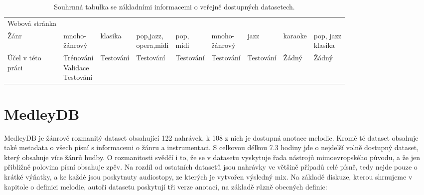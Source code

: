 \begin{table}[h!]
{\begin{tabular}{lllllllll}
        Webová stránka   & \tablefootnote{\url{https://medleydb.weebly.com/}} & \tablefootnote{\url{https://www.upf.edu/web/mtg/orchset}}      & \tablefootnote{\url{http://ismir2004.ismir.net/melody_contest/results.html}}       & \tablefootnote{\url{https://labrosa.ee.columbia.edu/projects/melody/}}       & \tablefootnote{\url{http://synthdatasets.weebly.com/mdb-melody-synth.html}}        & \tablefootnote{\url{https://jazzomat.hfm-weimar.de/}}    & \tablefootnote{\url{https://sites.google.com/site/unvoicedsoundseparation/mir-1k}} & \tablefootnote{\url{https://staff.aist.go.jp/m.goto/RWC-MDB/}} \\
        Žánr    & \shortstack[l]{mnoho-\\žánrový} & klasika & \shortstack[l]{pop,jazz,\\opera,midi} & \shortstack[l]{pop,\\midi} & \shortstack[l]{mnoho-\\žánrový} & jazz & karaoke & \shortstack[l]{pop, jazz\\klasika}  \\
        \shortstack[l]{Účel v této\\práci} & \shortstack[l]{Trénování\\Validace\\Testování} & Testování & Testování  & Testování  & Testování & Testování & Žádný & Žádný \\
    \bottomrule
    \end{tabular}
}%

\caption{Souhrnná tabulka se základními informacemi o veřejně dostupných datasetech.}\label{tab:dataset_summary}
\end{table}


\section{MedleyDB}

MedleyDB je žánrově rozmanitý dataset obsahující 122 nahrávek, k 108 z nich je dostupná anotace melodie. Kromě té dataset obsahuje také metadata o všech písní s informacemi o žánru a instrumentaci. S celkovou délkou 7.3 hodiny jde o nejdelší volně dostupný dataset, který obsahuje více žánrů hudby. O rozmanitosti svědčí i to, že se v datasetu vyskytuje řada nástrojů mimoevropského původu, a že jen přibližně polovina písní obsahuje zpěv. Na rozdíl od ostatních datasetů jsou nahrávky ve většině případů celé písně, tedy nejde pouze o krátké výňatky, a ke každé jsou poskytnuty audiostopy, ze kterých je vytvořen výsledný mix.
Na základě diskuze, kterou shrnujeme v kapitole o definici melodie, autoři datasetu \cite{Bittner2014} poskytují tři verze anotací, na základě různě obecných definic:

